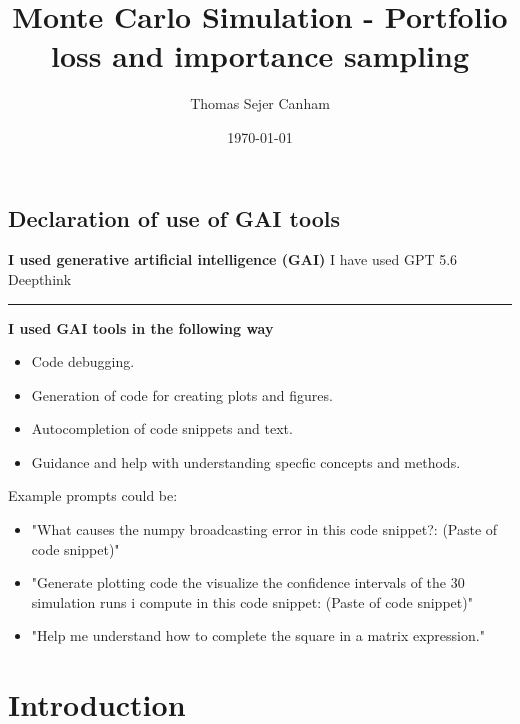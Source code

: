 \documentclass{article}
\title{Monte Carlo Simulation - Portfolio loss and importance sampling}
\author{Thomas Sejer Canham}
\date{\today}
\begin{document}
\begin{titlepage}
 \maketitle
 \tableofcontents
 \thispagestyle{empty}
\newpage
\section*{Declaration of use of GAI tools}

\noindent
\textbf{I used generative artificial intelligence (GAI)}
 I have used GPT 5.6 Deepthink
\vspace{1.5cm}

\noindent\rule{\textwidth}{0.4pt}

\vspace{0.5cm}

\noindent
\textbf{I used GAI tools in the following way}

\begin{itemize}[leftmargin=1.5em, itemsep=0.3em]
    \item Code debugging.
    \item Generation of code for creating plots and figures.
    \item Autocompletion of code snippets and text.
    \item Guidance and help with understanding specfic concepts and methods.
\end{itemize}

\vspace{0.5cm}
Example prompts could be:
\begin{itemize}[leftmargin=1.5em, itemsep=0.3em]
    \item "What causes the numpy broadcasting error in this code snippet?: (Paste of code snippet)"
    \item "Generate plotting code the visualize the confidence intervals of the 30 simulation runs i compute in this code snippet: (Paste of code snippet)"
    \item "Help me understand how to complete the square in a matrix expression."
\end{itemize}
\thispagestyle{empty}


\end{titlepage}
\section{Introduction}
\end{document}
